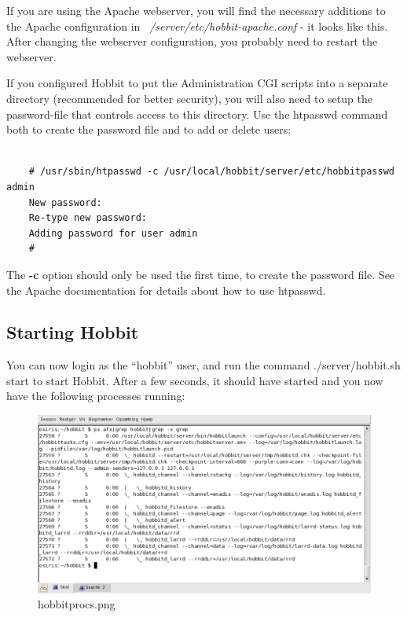  If you are using the Apache webserver, you will find the necessary additions to the Apache configuration in \emph{~/server/etc/hobbit-apache.conf}
 - it looks like this. After changing the webserver configuration, you probably need to restart the webserver.


 If you configured Hobbit to put the Administration CGI scripts into a separate directory (recommended for better security), you will also need to setup the password-file that controls access to this directory. Use the htpasswd command both to create the password file and to add or delete users:

\begin{verbatim}

	# /usr/sbin/htpasswd -c /usr/local/hobbit/server/etc/hobbitpasswd admin
	New password:
	Re-type new password:
	Adding password for user admin
	#

\end{verbatim}



 The \textbf{-c}
 option should only be used the first time, to create the password
 file. See the Apache documentation for details about how to use
 htpasswd.

\subsection{Starting Hobbit}


 You can now login as the ``hobbit'' user, and run the command
 ./server/hobbit.sh start to start Hobbit. After a few seconds, it
 should have started and you now have the following processes running: 


\begin{figure} 
\centering 
\caption{hobbitprocs.png}
\label{hobbitprocs.png}
\includegraphics[scale=0.6]{./hobbitprocs.png} 
\end{figure}

